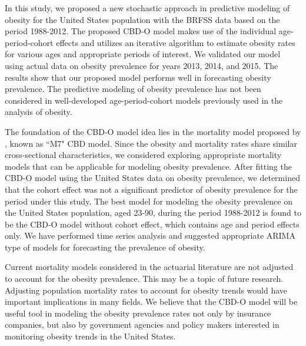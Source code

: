 \documentclass[11pt,letterpaper]{article}
\numberwithin{equation}{section}
\begin{document}
 In this study, we proposed a new stochastic approach in predictive modeling of obesity for the United States population with the BRFSS data based on the period 1988-2012. The proposed CBD-O model makes use of the individual age-period-cohort effects and utilizes an iterative algorithm to estimate obesity rates for various ages and appropriate periods of interest. %
 We validated our model using actual data on obesity prevalence for years 2013, 2014, and 2015.
 The results show that our proposed model performs well in forecasting obesity prevalence. The predictive modeling of obesity prevalence has not been considered in well-developed age-period-cohort models previously used in the analysis of obesity.

 The foundation of the CBD-O model idea lies in the mortality model proposed by \cite{Cairns+Blake+Dowd+Coughlan+Epstein+Khalaf+Allah:2011}, known as ``M7" CBD model. Since the obesity and mortality rates share similar cross-sectional characteristics, we considered exploring appropriate mortality models that can be applicable for modeling obesity prevalence. After fitting the CBD-O model using the United States data on obesity prevalence, we determined that the cohort effect was not a significant predictor of obesity prevalence for the period under this study. The best model for modeling the obesity prevalence on the United States population, aged 23-90, during the period 1988-2012  is found to be the  CBD-O model without cohort effect, which contains age and period effects only. We have performed time series analysis and suggested appropriate ARIMA type of models for forecasting the prevalence of obesity. %

Current mortality models considered in the actuarial literature are not adjusted to account for the obesity prevalence. This may be a topic of future research. Adjusting population mortality rates to account for obesity trends would have important implications in many fields. We believe that the CBD-O model will be useful tool in modeling the obesity prevalence rates not only by insurance companies, but also by government agencies and policy makers interested in monitoring obesity trends in the United States.



\end{document}

